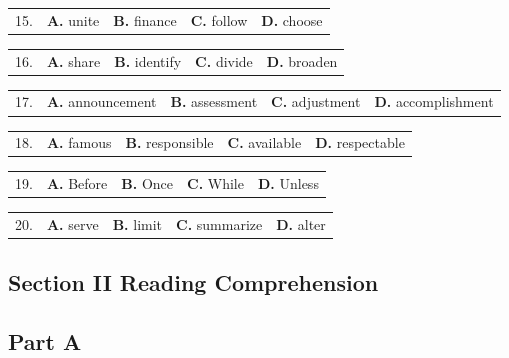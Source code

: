 \documentclass[UTF8,11pt]{ctexart}
\begin{document}
\noindent\begin{tabularx}{\linewidth}{@{}lXXXX@{}}15. & \textbf{A.} unite & \textbf{B.} finance & \textbf{C.} follow & \textbf{D.} choose\\\end{tabularx}\par

\noindent\begin{tabularx}{\linewidth}{@{}lXXXX@{}}16. & \textbf{A.} share & \textbf{B.} identify & \textbf{C.} divide & \textbf{D.} broaden\\\end{tabularx}\par

\noindent\begin{tabularx}{\linewidth}{@{}lXXXX@{}}17. & \textbf{A.} announcement & \textbf{B.} assessment & \textbf{C.} adjustment & \textbf{D.} accomplishment\\\end{tabularx}\par

\noindent\begin{tabularx}{\linewidth}{@{}lXXXX@{}}18. & \textbf{A.} famous & \textbf{B.} responsible & \textbf{C.} available & \textbf{D.} respectable\\\end{tabularx}\par

\noindent\begin{tabularx}{\linewidth}{@{}lXXXX@{}}19. & \textbf{A.} Before & \textbf{B.} Once & \textbf{C.} While & \textbf{D.} Unless\\\end{tabularx}\par

\noindent\begin{tabularx}{\linewidth}{@{}lXXXX@{}}20. & \textbf{A.} serve & \textbf{B.} limit & \textbf{C.} summarize & \textbf{D.} alter\\\end{tabularx}\par

\subsection*{\textbf{Section II Reading Comprehension}}


\subsection*{\textbf{Part A}}
\end{document}
